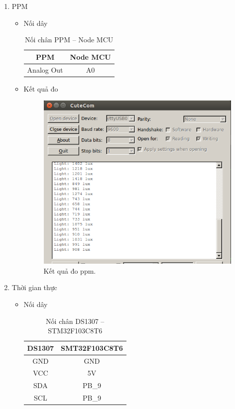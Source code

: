 \documentclass[a4paper,12pt,oneside]{article}
\begin{document}
\begin{enumerate}
\begin{itemize}
		
		\end{itemize}
		
	\item PPM
	\begin{itemize}
		\item Nối dây

		\begin{table}[!htp]
    	\centering
			\begin{tabular}{|c|c|}
			\hline 
		 	PPM & Node MCU \\ 
			\hline 
			Analog Out & A0 \\ 
			\hline 
			\end{tabular} 
		\caption{Nối chân PPM – Node MCU}
		\end{table}
		
		\item Kết quả đo
			\begin{figure}[H]
			\centering
			\begin{center}
			\includegraphics[scale=.6]{hinh/result_light.PNG} %
			\end{center}
			\caption{Kết quả đo ppm.}
			\end{figure}
		
	\end{itemize}
	
	\item Thời gian thực
	\begin{itemize}
		\item Nối dây
		\begin{table}[!htp]
    	\centering
		\begin{tabular}{|c|c|}
		\hline 
		DS1307 & SMT32F103C8T6 \\ 
		\hline 
		GND & GND \\ 
		\hline 
		VCC & 5V \\ 
		\hline 
		SDA & PB\_9 \\ 
		\hline 
		SCL & PB\_9 \\ 
		\hline 
		\end{tabular} 
    	\caption{Nối chân DS1307 – STM32F103C8T6}
		\end{table}
		

\end{itemize}
\end{enumerate}
\end{document}
